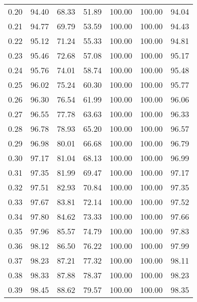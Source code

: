 \begin{tabular}{|c|c|c|c|c|c|c|}
      0.20 &     94.40 &     68.33 &      51.89 &  100.00 &     100.00 &         94.04 \\
      0.21 &     94.77 &     69.79 &      53.59 &  100.00 &     100.00 &         94.43 \\
      0.22 &     95.12 &     71.24 &      55.33 &  100.00 &     100.00 &         94.81 \\
      0.23 &     95.46 &     72.68 &      57.08 &  100.00 &     100.00 &         95.17 \\
      0.24 &     95.76 &     74.01 &      58.74 &  100.00 &     100.00 &         95.48 \\
      0.25 &     96.02 &     75.24 &      60.30 &  100.00 &     100.00 &         95.77 \\
      0.26 &     96.30 &     76.54 &      61.99 &  100.00 &     100.00 &         96.06 \\
      0.27 &     96.55 &     77.78 &      63.63 &  100.00 &     100.00 &         96.33 \\
      0.28 &     96.78 &     78.93 &      65.20 &  100.00 &     100.00 &         96.57 \\
      0.29 &     96.98 &     80.01 &      66.68 &  100.00 &     100.00 &         96.79 \\
      0.30 &     97.17 &     81.04 &      68.13 &  100.00 &     100.00 &         96.99 \\
      0.31 &     97.35 &     81.99 &      69.47 &  100.00 &     100.00 &         97.17 \\
      0.32 &     97.51 &     82.93 &      70.84 &  100.00 &     100.00 &         97.35 \\
      0.33 &     97.67 &     83.81 &      72.14 &  100.00 &     100.00 &         97.52 \\
      0.34 &     97.80 &     84.62 &      73.33 &  100.00 &     100.00 &         97.66 \\
      0.35 &     97.96 &     85.57 &      74.79 &  100.00 &     100.00 &         97.83 \\
      0.36 &     98.12 &     86.50 &      76.22 &  100.00 &     100.00 &         97.99 \\
      0.37 &     98.23 &     87.21 &      77.32 &  100.00 &     100.00 &         98.11 \\
      0.38 &     98.33 &     87.88 &      78.37 &  100.00 &     100.00 &         98.23 \\
      0.39 &     98.45 &     88.62 &      79.57 &  100.00 &     100.00 &         98.35 \\

\end{tabular}
